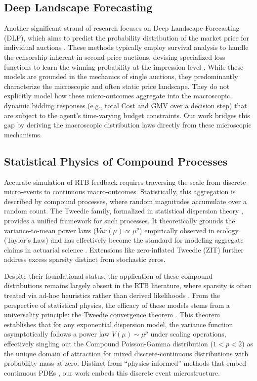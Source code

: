 \documentclass[sigconf, anonymous, review]{acmart}
\begin{document}
\subsection{Deep Landscape Forecasting}
Another significant strand of research focuses on Deep Landscape Forecasting (DLF), which aims to predict the probability distribution of the market price for individual auctions \cite{RLBid, DLF, ou2023deep}. 
These methods typically employ survival analysis to handle the censorship inherent in second-price auctions, devising specialized loss functions to learn the winning probability at the impression level \cite{li2022arbitrary}.
While these models are grounded in the mechanics of single auctions, they predominantly characterize the microscopic and often static price landscape.
They do not explicitly model how these micro-outcomes aggregate into the macroscopic, dynamic bidding responses (e.g., total Cost and GMV over a decision step) that are subject to the agent's time-varying budget constraints.
Our work bridges this gap by deriving the macroscopic distribution laws directly from these microscopic mechanisms.


\subsection{Statistical Physics of Compound Processes}
Accurate simulation of RTB feedback requires traversing the scale from discrete micro-events to continuous macro-outcomes.
Statistically, this aggregation is described by compound processes, where random magnitudes accumulate over a random count.
The Tweedie family, formalized in statistical dispersion theory \cite{jorgensen1997theory}, provides a unified framework for such processes.
It theoretically grounds the variance-to-mean power laws ($Var(\mu) \propto \mu^p$) empirically observed in ecology (Taylor's Law) \cite{taylor1961aggregation} and has effectively become the standard for modeling aggregate claims in actuarial science \cite{smyth2002fitting}.
Extensions like zero-inflated Tweedie (ZIT) \cite{ZIT} further address excess sparsity distinct from stochastic zeros.

Despite their foundational status, the application of these compound distributions remains largely absent in the RTB literature, where sparsity is often treated via ad-hoc heuristics rather than derived likelihoods \cite{Bid2X}.
From the perspective of statistical physics, the efficacy of these models stems from a universality principle: the Tweedie convergence theorem \cite{jorgensen1997theory}.
This theorem establishes that for any exponential dispersion model, the variance function asymptotically follows a power law $V(\mu) \sim \mu^p$ under scaling operations, effectively singling out the Compound Poisson-Gamma distribution ($1 < p < 2$) as the unique domain of attraction for mixed discrete-continuous distributions with probability mass at zero.
Distinct from ``physics-informed'' methods that embed continuous PDEs \cite{raissi2019physics}, our work embeds this discrete event microstructure.
\end{document}
